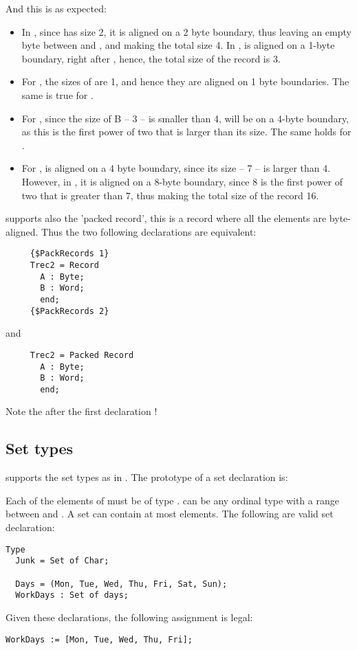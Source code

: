 And this is as expected:
\begin{itemize}
\item In , since  has size 2, it is
aligned on a 2 byte boundary, thus leaving an empty byte between 
and , and making the total size 4. In ,  is aligned
on a 1-byte boundary, right after , hence, the total size of the
record is 3.
\item For , the sizes of  are 1, and hence they are aligned on 1
byte boundaries. The same is true for .
\item For , since the size of B -- 3 -- is smaller than 4,  will
be on a  4-byte boundary, as this is the first power of two that is
larger than its size. The same holds for .
\item For ,  is aligned on a 4 byte boundary, since its size --
7 -- is larger than 4. However, in , it is aligned on a 8-byte
boundary, since 8 is the first power of two that is greater than 7, thus
making the total size of the record 16.
\end{itemize}
\fpc supports also the 'packed record', this is a record where all the
elements are byte-aligned. Thus the two following declarations are equivalent:
\begin{verbatim}
     {$PackRecords 1}
     Trec2 = Record
       A : Byte;
       B : Word;
       end;
     {$PackRecords 2}
\end{verbatim}
and
\begin{verbatim}
     Trec2 = Packed Record
       A : Byte;
       B : Word;
       end;
\end{verbatim}
Note the  after the first declaration !
%
\subsection{Set types}
\fpc supports the set types as in \tp. The prototype of a set
declaration is:

Each of the elements of  must be of type .
 can be any ordinal type with a range between  and
. A set can contain at most  elements.
The following are valid set declaration:
\begin{verbatim}
Type
  Junk = Set of Char;

  Days = (Mon, Tue, Wed, Thu, Fri, Sat, Sun);
  WorkDays : Set of days;
\end{verbatim}
Given these declarations, the following assignment is legal:
\begin{verbatim}
WorkDays := [Mon, Tue, Wed, Thu, Fri];
\end{verbatim}

